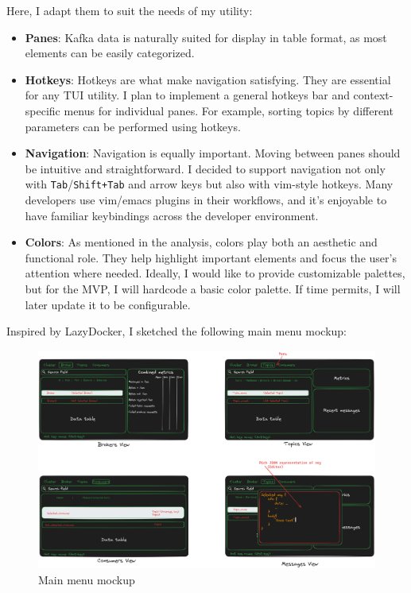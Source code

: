\documentclass[10pt , a4paper]{report}
\begin{document}
Here, I adapt them to suit the needs of my utility:
\begin{itemize}
    \item \textbf{Panes}: Kafka data is naturally suited for display in table format, as most elements can be easily categorized.
    \item \textbf{Hotkeys}: Hotkeys are what make navigation satisfying. They are essential for any TUI utility. I plan to implement a general hotkeys bar and context-specific menus for individual panes. For example, sorting topics by different parameters can be performed using hotkeys.
    \item \textbf{Navigation}: Navigation is equally important. Moving between panes should be intuitive and straightforward. I decided to support navigation not only with \texttt{Tab}/\texttt{Shift+Tab} and arrow keys but also with vim-style hotkeys. Many developers use vim/emacs plugins in their workflows, and it’s enjoyable to have familiar keybindings across the developer environment.
    \item \textbf{Colors}: As mentioned in the analysis, colors play both an aesthetic and functional role. They help highlight important elements and focus the user’s attention where needed. Ideally, I would like to provide customizable palettes, but for the MVP, I will hardcode a basic color palette. If time permits, I will later update it to be configurable.
\end{itemize}

Inspired by LazyDocker, I sketched the following main menu mockup:

\begin{figure}[htbp]
    \centering
    \includegraphics[width=1\linewidth]{imgs/UIMaquette.png}
    \caption{Main menu mockup}
    \label{fig:ui_maquette}
\end{figure}
\end{document}
